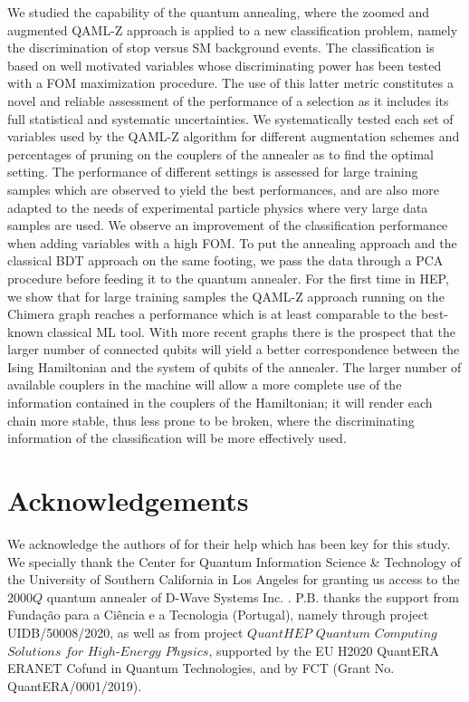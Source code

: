 \documentclass{article}
\begin{document}
We studied the capability of the quantum annealing, where the zoomed and
augmented QAML-Z approach is applied to a new classification problem, namely
the discrimination of stop versus SM background events. The classification
is based on well motivated variables whose discriminating power has been
tested with a FOM maximization procedure. The use of this latter metric
constitutes a novel and reliable assessment of the performance of a selection
as it includes its full statistical and systematic uncertainties. We
systematically tested each set of variables used by the QAML-Z algorithm
for different augmentation schemes and percentages of pruning on
the couplers of the annealer as to find the optimal setting. The performance
of different settings is assessed for large training samples which are
observed to yield the best performances, and are also more adapted to the
needs of experimental particle physics where very large data samples are
used. We observe an improvement of the classification performance when
adding variables with a high FOM. To put the annealing approach and the
classical BDT approach on the same footing, we pass the data through a PCA
procedure before feeding it to the quantum annealer. For the first time in
HEP, we show that for large training samples the QAML-Z approach running on
the Chimera graph reaches a performance which is at least comparable to the
best-known classical ML tool. With more recent graphs there is the prospect that the
larger number of connected qubits will yield a better correspondence between
the Ising Hamiltonian and the system of qubits of the annealer. The larger
number of available couplers in the machine will allow a more complete use
of the information contained in the couplers of the Hamiltonian; it will
render each chain more stable, thus less prone to be broken, where the
discriminating information of the classification will be more effectively used.

\section*{Acknowledgements}

We acknowledge the authors of \cite{nature,qamlz} for their help which has 
been key for this study. We specially thank the Center for Quantum 
Information Science \& Technology of the University of Southern California 
in Los Angeles for granting us access to the $2000Q$ quantum annealer of 
D-Wave Systems Inc. \cite{dwave}. P.B. thanks the support from 
Funda\c{c}\~{a}o para a Ci\^{e}ncia e a Tecnologia (Portugal), namely 
through project UIDB/50008/2020, as well as from project $QuantHEP$
$Quantum$ $Computing$ $Solutions$ $for$ $High$-$Energy$ $Physics$, 
supported by the EU H2020 QuantERA ERANET Cofund in Quantum Technologies, 
and by FCT (Grant No. QuantERA/0001/2019).
\end{document}
